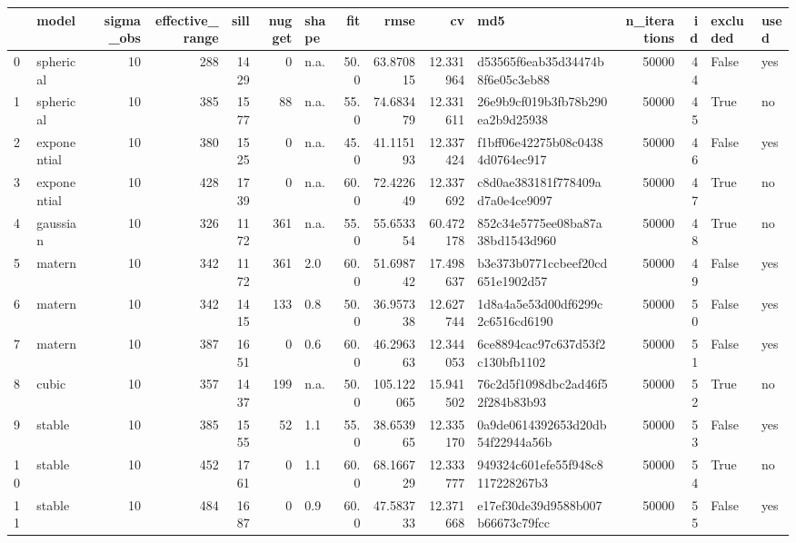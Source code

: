 \begin{tabular}{llrrrrlrrrlrrll}
\toprule
{} &        model &  sigma\_obs &  effective\_range &  sill &  nugget & shape &   fit &        rmse &         cv &                               md5 &  n\_iterations &  id &  excluded & used \\
\midrule
0  &    spherical &         10 &              288 &  1429 &       0 &  n.a. &  50.0 &   63.870815 &  12.331964 &  d53565f6eab35d34474b8f6e05c3eb88 &         50000 &  44 &     False &  yes \\
1  &    spherical &         10 &              385 &  1577 &      88 &  n.a. &  55.0 &   74.683479 &  12.331611 &  26e9b9cf019b3fb78b290ea2b9d25938 &         50000 &  45 &      True &   no \\
2  &  exponential &         10 &              380 &  1525 &       0 &  n.a. &  45.0 &   41.115193 &  12.337424 &  f1bff06e42275b08c04384d0764ec917 &         50000 &  46 &     False &  yes \\
3  &  exponential &         10 &              428 &  1739 &       0 &  n.a. &  60.0 &   72.422649 &  12.337692 &  c8d0ae383181f778409ad7a0e4ce9097 &         50000 &  47 &      True &   no \\
4  &     gaussian &         10 &              326 &  1172 &     361 &  n.a. &  55.0 &   55.653354 &  60.472178 &  852c34e5775ee08ba87a38bd1543d960 &         50000 &  48 &      True &   no \\
5  &       matern &         10 &              342 &  1172 &     361 &   2.0 &  60.0 &   51.698742 &  17.498637 &  b3e373b0771ccbeef20cd651e1902d57 &         50000 &  49 &     False &  yes \\
6  &       matern &         10 &              342 &  1415 &     133 &   0.8 &  50.0 &   36.957338 &  12.627744 &  1d8a4a5e53d00df6299c2c6516cd6190 &         50000 &  50 &     False &  yes \\
7  &       matern &         10 &              387 &  1651 &       0 &   0.6 &  60.0 &   46.296363 &  12.344053 &  6ce8894cac97c637d53f2c130bfb1102 &         50000 &  51 &     False &  yes \\
8  &        cubic &         10 &              357 &  1437 &     199 &  n.a. &  50.0 &  105.122065 &  15.941502 &  76c2d5f1098dbc2ad46f52f284b83b93 &         50000 &  52 &      True &   no \\
9  &       stable &         10 &              385 &  1555 &      52 &   1.1 &  55.0 &   38.653965 &  12.335170 &  0a9de0614392653d20db54f22944a56b &         50000 &  53 &     False &  yes \\
10 &       stable &         10 &              452 &  1761 &       0 &   1.1 &  60.0 &   68.166729 &  12.333777 &  949324c601efe55f948c8117228267b3 &         50000 &  54 &      True &   no \\
11 &       stable &         10 &              484 &  1687 &       0 &   0.9 &  60.0 &   47.583733 &  12.371668 &  e17ef30de39d9588b007b66673c79fcc &         50000 &  55 &     False &  yes \\
\bottomrule
\end{tabular}

